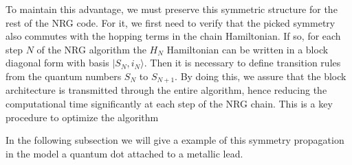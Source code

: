 To maintain  this advantage, we must preserve this symmetric structure for the rest of the NRG code. For it, we first need to verify that the picked symmetry also commutes with the hopping terms in the chain Hamiltonian. If so, for each step  $N$ of the NRG algorithm  the $H_N$ Hamiltonian can be written in a block diagonal form with basis 
$\vert S_N, i_N\rangle$. Then it is necessary to define transition rules from the quantum numbers $S_N$ to $S_{N+1}$. By doing this, we assure that the block architecture is transmitted through the entire algorithm, hence reducing the computational time significantly at each step of the NRG chain. This is a key procedure to optimize the algorithm


In the following subsection we will give a example of this symmetry propagation in the model a quantum dot attached to a metallic lead. 








 



